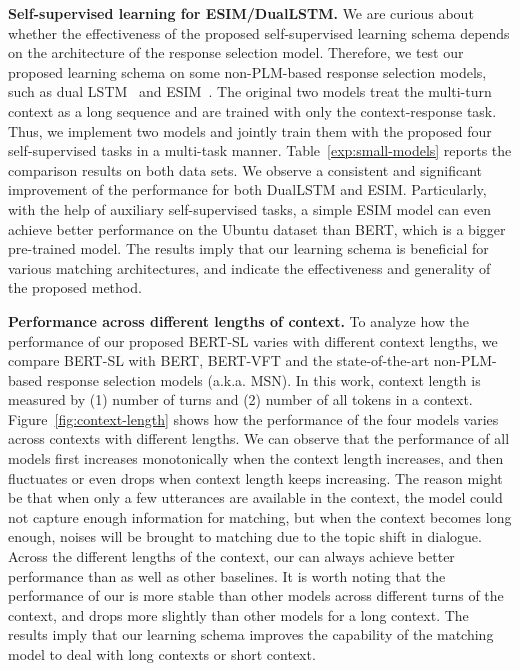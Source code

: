 \documentclass{article}
\begin{document}
\vspace{1.5mm}
\noindent\textbf{Self-supervised learning for ESIM/DualLSTM.}
We are curious about whether the effectiveness of the proposed self-supervised learning schema depends on the architecture of the response selection model. Therefore, we test our proposed learning schema on some non-PLM-based response selection models, such as dual LSTM~\cite{lowe-etal-2015-ubuntu} and ESIM~\cite{chen2019sequential}. The original two models treat the multi-turn context as a long sequence and are trained with only the context-response task. Thus, we implement two models and jointly train them with the proposed four self-supervised tasks in a multi-task manner.
Table~\ref{exp:small-models} reports the comparison results on both data sets. We observe a consistent and significant improvement of the performance for both DualLSTM and ESIM.
Particularly, with the help of auxiliary self-supervised tasks, a simple ESIM  model  can  even  achieve  better  performance on the Ubuntu dataset  than BERT, which is a bigger pre-trained model.
The results imply that our learning schema is beneficial for various matching architectures, and indicate the effectiveness and generality of the proposed method.

\vspace{1.5mm}
\noindent\textbf{Performance across different lengths of context.}
To analyze how the performance of our proposed BERT-SL varies with different context lengths, we compare BERT-SL with BERT, BERT-VFT and the state-of-the-art non-PLM-based response selection models (a.k.a. MSN).
In this work, context length is measured by (1) number of turns and (2) number of all tokens in a context.
Figure~\ref{fig:context-length} shows how the performance of the four models varies across contexts with different lengths.
We can observe that the performance of all models first increases monotonically when the context length increases, and then fluctuates or even drops when context length keeps increasing.
The reason might be that when only a few utterances are available in the context, the model could not capture enough information for matching, but when the context becomes long enough, noises will be brought to matching due to the topic shift in dialogue.
Across the different lengths of the context, our  can always achieve better performance than  as well as other baselines.
It is worth noting that the performance of our  is more stable than other models across different turns of the context, and drops more slightly than other models for a long context.
The results imply that our learning schema improves the capability of the matching model to deal with long contexts or short context.
 \vspace{-1.5mm}
\end{document}
